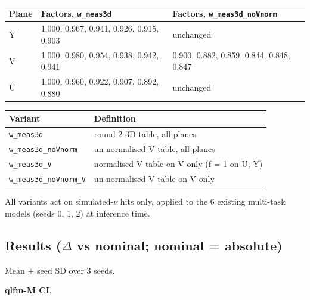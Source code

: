 \documentclass[10pt,a4paper]{article}
\begin{document}
\begin{center}\small
\setlength{\tabcolsep}{3pt}\renewcommand{\arraystretch}{1.15}
\begin{tabularx}{\linewidth}{LLL}
\toprule
\textbf{Plane} & \textbf{Factors, \texttt{w\_\allowbreak{}meas3d}} & \textbf{Factors, \texttt{w\_\allowbreak{}meas3d\_\allowbreak{}noVnorm}} \\
\midrule
Y & 1.000, 0.967, 0.941, 0.926, 0.915, 0.903 & unchanged \\
V & 1.000, 0.980, 0.954, 0.938, 0.942, 0.941 & 0.900, 0.882, 0.859, 0.844, 0.848, 0.847 \\
U & 1.000, 0.960, 0.922, 0.907, 0.892, 0.880 & unchanged \\
\bottomrule
\end{tabularx}
\end{center}
\begin{center}\small
\setlength{\tabcolsep}{3pt}\renewcommand{\arraystretch}{1.15}
\begin{tabularx}{\linewidth}{LL}
\toprule
\textbf{Variant} & \textbf{Definition} \\
\midrule
\texttt{w\_\allowbreak{}meas3d} & round-2 3D table, all planes \\
\texttt{w\_\allowbreak{}meas3d\_\allowbreak{}noVnorm} & un-normalised V table, all planes \\
\texttt{w\_\allowbreak{}meas3d\_\allowbreak{}V} & normalised V table on V only (f = 1 on U, Y) \\
\texttt{w\_\allowbreak{}meas3d\_\allowbreak{}noVnorm\_\allowbreak{}V} & un-normalised V table on V only \\
\bottomrule
\end{tabularx}
\end{center}
All variants act on simulated-$\nu$ hits only, applied to the 6 existing multi-task models (seeds 0, 1, 2) at inference time.

\subsection{Results ($\Delta$ vs nominal; nominal = absolute)}
Mean $\pm$ seed SD over 3 seeds.

\textbf{qlfm-M CL}
\end{document}
